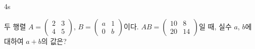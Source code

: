 \documentclass[10pt]{article}
\begin{document}
\begin{pagepair}
\begin{minipage}[t][\probboxheight][t]{0.46\linewidth}
\begin{problem}{4}{s}
\par\smallskip
두 행렬 $A = \begin{pmatrix} 2 & 3 \\ 4 & 5 \end{pmatrix}$, $B = \begin{pmatrix} a & 1 \\ 0 & b \end{pmatrix}$이다. $AB = \begin{pmatrix} 10 & 8 \\ 20 & 14 \end{pmatrix}$일 때, 실수 $a$, $b$에 대하여 $a + b$의 값은?
\begin{choices}
\end{choices}
\end{problem}
\end{minipage}
\end{pagepair}

\setlength{\probboxheight}{100mm}
\end{document}
